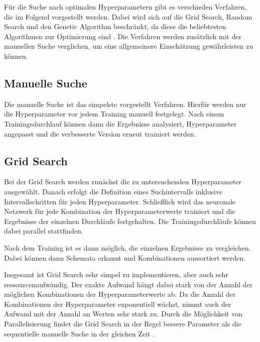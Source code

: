 Für die Suche nach optimalen Hyperparametern gibt es verschieden Verfahren, die im Folgend vorgestellt werden.
Dabei wird sich auf die Grid Search, Random Search und den Genetic Algorithm beschränkt, da diese die beliebtesten Algorithmen zur Optimierung sind \cite{hyperparameters-search-comparison-focus-genetic}.
Die Verfahren werden zusätzlich mit der manuellen Suche verglichen, um eine allgemeinere Einschätzung gewährleisten zu können.

\subsection{Manuelle Suche}
Die manuelle Suche ist das simpelste vorgestellt Verfahren.
Hierfür werden nur die Hyperparameter vor jedem Training manuell festgelegt.
Nach einem Trainingsdurchlauf können dann die Ergebnisse analysiert, Hyperparameter angepasst und die verbesserte Version erneut trainiert werden.


\subsection{Grid Search}
Bei der Grid Search \cite{hyperparameters-grid-search} werden zunächst die zu untersuchenden Hyperparameter ausgewählt.
Danach erfolgt die Definition eines Suchintervalls inklusive Intervallschritten für jeden Hyperparameter.
Schließlich wird das neuronale Netzwerk für jede Kombination der Hyperparameterwerte trainiert und die Ergebnisse der einzelnen Durchläufe festgehalten.
Die Trainingsdurchläufe können dabei parallel stattfinden.

Nach dem Training ist es dann möglich, die einzelnen Ergebnisse zu vergleichen.
Dabei können dann Schemata erkannt und Kombinationen aussortiert werden.
\newline

Insgesamt ist Grid Search sehr simpel zu implementieren, aber auch sehr ressourcenaufwändig.
Der exakte Aufwand hängt dabei stark von der Anzahl der möglichen Kombinationen der Hyperparameterwerte ab.
Da die Anzahl der Kombinationen der Hyperparameter exponentiell  wächst, nimmt auch der Aufwand mit der Anzahl an Werten sehr stark zu.
Durch die Möglichkeit von Parallelisierung findet die Grid Search in der Regel bessere Parameter als die sequentielle manuelle Suche in der gleichen Zeit \cite{hyperparameters-random-search}.

